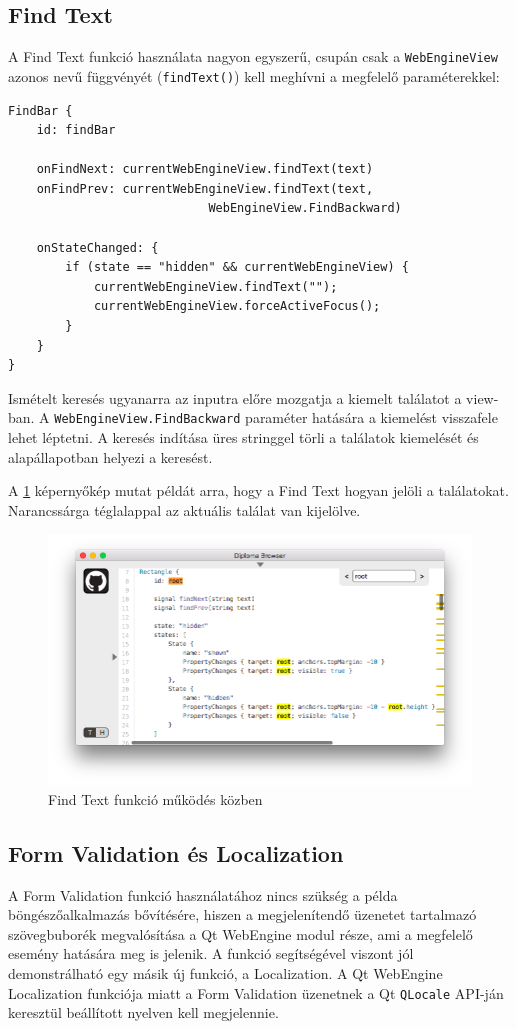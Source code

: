 \documentclass[12pt]{report}
\begin{document}
\subsection{Find Text}

A Find Text funkció használata nagyon egyszerű, csupán csak a \texttt{WebEngineView} azonos
nevű függvényét (\texttt{findText()}) kell meghívni a megfelelő paraméterekkel:
\begin{lstlisting}[title=main.qml]
FindBar {
    id: findBar

    onFindNext: currentWebEngineView.findText(text)
    onFindPrev: currentWebEngineView.findText(text,
                            WebEngineView.FindBackward)

    onStateChanged: {
        if (state == "hidden" && currentWebEngineView) {
            currentWebEngineView.findText("");
            currentWebEngineView.forceActiveFocus();
        }
    }
}
\end{lstlisting}
Ismételt keresés ugyanarra az inputra előre mozgatja a kiemelt találatot a view-ban. A
\texttt{WebEngineView.FindBackward} paraméter hatására a kiemelést visszafele lehet léptetni.
A keresés indítása üres stringgel törli a találatok kiemelését és alapállapotban helyezi
a keresést.

A \ref{fig:find-bar-screen} képernyőkép mutat példát arra, hogy a Find Text hogyan jelöli
a találatokat. Narancssárga téglalappal az aktuális találat van kijelölve.

\begin{figure}[ht]
    \centering
    \includegraphics[scale=0.5]{FindBar-screen}
    \caption{
        \label{fig:find-bar-screen}
        Find Text funkció működés közben
    }
\end{figure}

\newpage
\subsection{Form Validation és Localization}
A Form Validation funkció használatához nincs szükség a példa böngészőalkalmazás bővítésére,
hiszen a megjelenítendő üzenetet tartalmazó szövegbuborék megvalósítása a Qt WebEngine modul
része, ami a megfelelő esemény hatására meg is jelenik. A funkció segítségével viszont jól
demonstrálható egy másik új funkció, a Localization. A Qt WebEngine Localization funkciója
miatt a Form Validation üzenetnek a Qt \texttt{QLocale} API-ján keresztül beállított nyelven
kell megjelennie.
\end{document}
